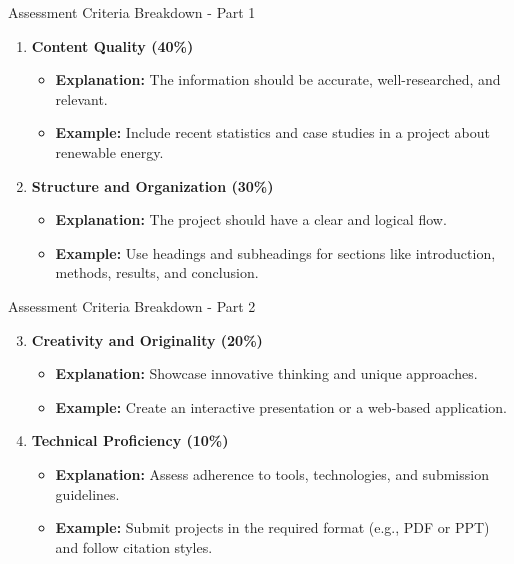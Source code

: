 \documentclass[aspectratio=169]{beamer}
\begin{document}
\begin{frame}[fragile]{Assessment Criteria Breakdown - Part 1}
    \begin{enumerate}
        \item \textbf{Content Quality (40\%)} 
        \begin{itemize}
            \item \textbf{Explanation:} The information should be accurate, well-researched, and relevant.
            \item \textbf{Example:} Include recent statistics and case studies in a project about renewable energy.
        \end{itemize}
        
        \item \textbf{Structure and Organization (30\%)} 
        \begin{itemize}
            \item \textbf{Explanation:} The project should have a clear and logical flow.
            \item \textbf{Example:} Use headings and subheadings for sections like introduction, methods, results, and conclusion.
        \end{itemize}
    \end{enumerate}
\end{frame}

\begin{frame}[fragile]{Assessment Criteria Breakdown - Part 2}
    \begin{enumerate}
        \setcounter{enumi}{2} %
        \item \textbf{Creativity and Originality (20\%)} 
        \begin{itemize}
            \item \textbf{Explanation:} Showcase innovative thinking and unique approaches.
            \item \textbf{Example:} Create an interactive presentation or a web-based application.
        \end{itemize}

        \item \textbf{Technical Proficiency (10\%)} 
        \begin{itemize}
            \item \textbf{Explanation:} Assess adherence to tools, technologies, and submission guidelines.
            \item \textbf{Example:} Submit projects in the required format (e.g., PDF or PPT) and follow citation styles.
        \end{itemize}
    \end{enumerate}
\end{frame}
\end{document}

